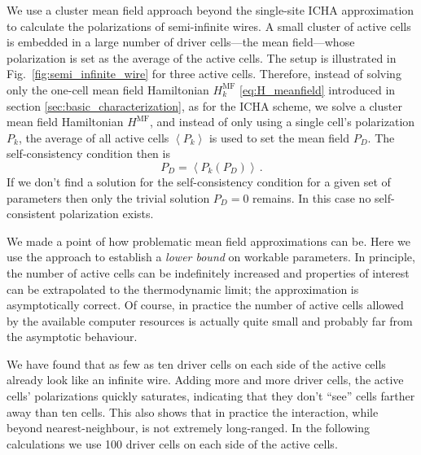 We use a cluster mean field approach beyond the single-site ICHA approximation
to calculate the polarizations of semi-infinite wires. A small cluster of active
cells is embedded in a large number of driver cells---the mean field---whose
polarization is set as the average of the active cells. The setup is illustrated
in Fig.~\ref{fig:semi_infinite_wire} for three active cells. Therefore, instead
of solving only the one-cell mean field Hamiltonian $H^{\mathrm{MF}}_k$
\eqref{eq:H_meanfield} introduced in section \ref{sec:basic_characterization},
as for the ICHA scheme, we solve a cluster mean field Hamiltonian
$H^{\mathrm{MF}}$, and instead of only using a single cell's polarization $P_k$,
the average of all active cells $\left< P_k \right>$ is used to set the mean
field $P_D$. The self-consistency condition then is
%
\begin{equation}
  P_D = \left< P_k \left( P_D \right) \right> \, .
\end{equation}
%
If we don't find a solution for the self-consistency condition for a given set
of parameters then only the trivial solution $P_D = 0$ remains. In this case no
self-consistent polarization exists.

We made a point of how problematic mean field approximations can be. Here we use
the approach to establish a \emph{lower bound} on workable parameters. In
principle, the number of active cells can be indefinitely increased and
properties of interest can be extrapolated to the thermodynamic limit; the
approximation is asymptotically correct. Of course, in practice the number of
active cells allowed by the available computer resources is actually quite small
and probably far from the asymptotic behaviour.

We have found that as few as ten driver cells on each side of the active cells
already look like an infinite wire. Adding more and more driver cells, the active
cells' polarizations quickly saturates, indicating that they don't ``see'' cells
farther away than ten cells. This also shows that in practice the interaction,
while beyond nearest-neighbour, is not extremely long-ranged. In the following
calculations we use 100 driver cells on each side of the active cells.

